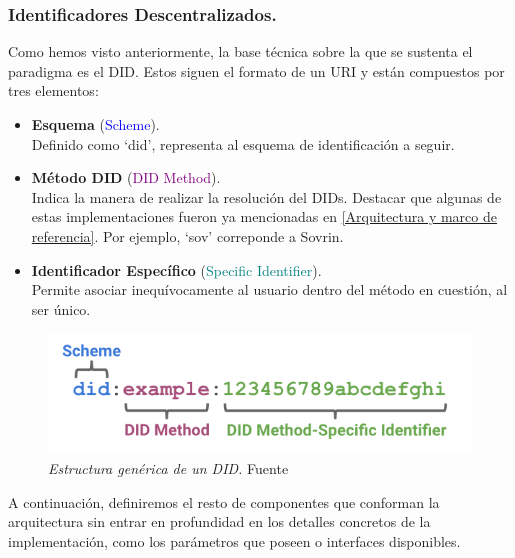 \documentclass[../main.tex]{subfiles}
\begin{document}
\newpage
\subsubsection{Identificadores Descentralizados.}\label{Identificadores Descentralizados}
Como hemos visto anteriormente, la base técnica sobre la que se sustenta el paradigma es el \acrfull{DID}. Estos siguen el formato de un \Gls{URI} y están compuestos por tres elementos:

\begin{itemize}
    \item \textbf{Esquema} (\textcolor{blue}{Scheme}). \\
    Definido como `did', representa al esquema de identificación a seguir.
    
    \item \textbf{Método DID} (\textcolor{purple}{DID Method}). \\
    Indica la manera de realizar la resolución del \acrshort{DID}s. Destacar que algunas de estas implementaciones fueron ya mencionadas en \ref{Arquitectura y marco de referencia}. Por ejemplo, `sov' correponde a Sovrin.
    
    \item \textbf{Identificador Específico} (\textcolor{teal}{Specific Identifier}). \\ 
    Permite asociar inequívocamente al usuario dentro del método en cuestión, al ser único.
\end{itemize}

\begin{figure}[htbp]
    \centering
    \includegraphics[width=0.75\linewidth]{images/DID_Estructura.png}
    \caption{\textit{Estructura genérica de un \acrshort{DID}.} Fuente \cite{DID-core}}
    \label{fig:DID_Estructura}
\end{figure}

A continuación, definiremos el resto de componentes que conforman la arquitectura sin entrar en profundidad en los detalles concretos de la implementación, como los parámetros que poseen o interfaces disponibles.  
\end{document}

